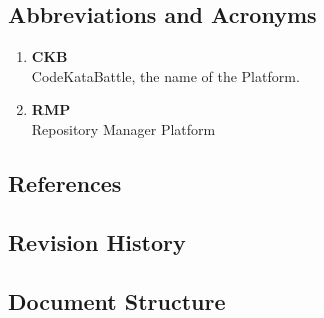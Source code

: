 \subsection{Abbreviations and Acronyms}
\begin{enumerate}[label=$\bullet$]
    \item \textbf{CKB}\\CodeKataBattle, the name of the Platform.
    \item \textbf{RMP}\\Repository Manager Platform
\end{enumerate}
\subsection{References}

\subsection{Revision History}
\subsection{Document Structure}

\newpage
%